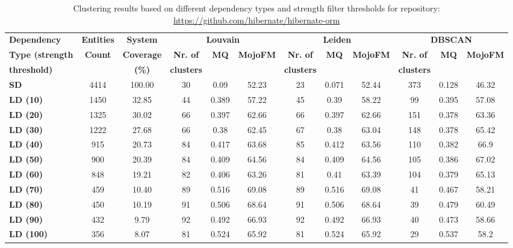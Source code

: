 \documentclass{ieeeaccess}
\begin{document}
\begin{table}[htbp]
\centering
\caption{Clustering results based on different dependency types and strength filter thresholds for repository: \href{https://github.com/hibernate/hibernate-orm}{https://github.com/hibernate/hibernate-orm}}
\label{tab:clustering_results_hibernate}
\setlength{\tabcolsep}{7pt} 
\begin{tabular}{|l|c|c|ccc|ccc|ccc|}
\hline
 \textbf{Dependency} &  \textbf{Entities} & \textbf{System} & \multicolumn{3}{c|}{\textbf{Louvain}} & \multicolumn{3}{c|}{\textbf{Leiden}} & \multicolumn{3}{c|}{\textbf{DBSCAN}} \\
\cline{4-12}
\textbf{Type (strength } &  \textbf{Count} & \textbf{Coverage} & \textbf{Nr. of } & \textbf{MQ} & \textbf{MojoFM} & \textbf{Nr. of} & \textbf{MQ} & \textbf{MojoFM} & \textbf{Nr. of} & \textbf{MQ} & \textbf{MojoFM}  \\
\textbf{threshold)} &  & \textbf{(\%)} & \textbf{clusters} & & & \textbf{clusters} & &  & \textbf{clusters} & &\\
\hline
\rowcolor[HTML]{ECECEC} \textbf{SD} & 4414 & 100.00 & 30 & 0.09 & 52.23 & 23 & 0.071 & 52.44 & 373 & 0.128 & 46.32  \\
\textbf{LD (10)} & 1450 & 32.85 & 44 & 0.389 & 57.22 & 45 & 0.39 & 58.22 & 99 & 0.395 & 57.08 \\
\textbf{LD (20)} & 1325 & 30.02 & 66 & 0.397 & 62.66 & 66 & 0.397 & 62.66 & 151 & 0.378 & 63.36 \\
\textbf{LD (30)} & 1222 & 27.68 & 66 & 0.38 & 62.45 & 67 & 0.38 & 63.04 & 148 & 0.378 & 65.42 \\
\textbf{LD (40)} & 915 & 20.73 & 84 & 0.417 & 63.68 & 85 & 0.412 & 63.56 & 110 & 0.382 & 66.9 \\
\textbf{LD (50)} & 900 & 20.39 & 84 & 0.409 & 64.56 & 84 & 0.409 & 64.56 & 105 & 0.386 & 67.02 \\
\textbf{LD (60)} & 848 & 19.21 & 82 & 0.406 & 63.26 & 81 & 0.41 & 63.39 & 104 & 0.379 & 65.13 \\
\textbf{LD (70)} & 459 & 10.40 & 89 & 0.516 & \cellcolor[HTML]{fef9e4}69.08 & 89 & 0.516 & \cellcolor[HTML]{fef9e4}69.08 & 41 & 0.467 & 58.21 \\
\textbf{LD (80)} & 450 & 10.19 & 91 & 0.506 & 68.64 & 91 & 0.506 & 68.64 & 39 & 0.479 & \cellcolor[HTML]{fef9e4}60.49 \\
\textbf{LD (90)} & 432 & 9.79 & 92 & 0.492 & 66.93 & 92 & 0.492 & 66.93 & 40 & 0.473 & 58.66 \\
\textbf{LD (100)} & 356 & 8.07 & 81 & \cellcolor[HTML]{fef9e4}0.524 & 65.92 & 81 & \cellcolor[HTML]{fef9e4}0.524 & 65.92 & 29 & \cellcolor[HTML]{fef9e4}0.537 & 58.2 \\

\end{tabular}
\end{table}
\end{document}
